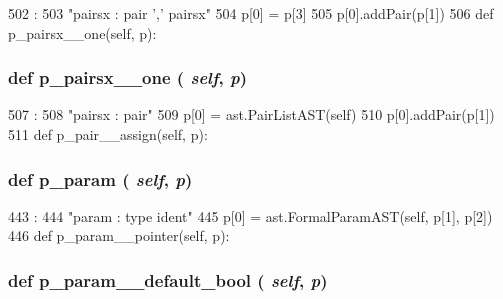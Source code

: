 \begin{DoxyVerb}
\begin{DoxyCode}
502                                :
503         "pairsx : pair ',' pairsx"
504         p[0] = p[3]
505         p[0].addPair(p[1])
506 
    def p_pairsx__one(self, p):
\end{DoxyCode}
\hypertarget{classslicc_1_1parser_1_1SLICC_aaf9410b6d0eedbb8812ebb8ac3609cdf}{
\subsubsection[{p\_\-pairsx\_\-\_\-one}]{\setlength{\rightskip}{0pt plus 5cm}def p\_\-pairsx\_\-\_\-one ( {\em self}, \/   {\em p})}}
\label{classslicc_1_1parser_1_1SLICC_aaf9410b6d0eedbb8812ebb8ac3609cdf}



\begin{DoxyCode}
507                               :
508         "pairsx : pair"
509         p[0] = ast.PairListAST(self)
510         p[0].addPair(p[1])
511 
    def p_pair__assign(self, p):
\end{DoxyCode}
\hypertarget{classslicc_1_1parser_1_1SLICC_a44acb9129e75c48ab21ea601ece829d9}{
\subsubsection[{p\_\-param}]{\setlength{\rightskip}{0pt plus 5cm}def p\_\-param ( {\em self}, \/   {\em p})}}
\label{classslicc_1_1parser_1_1SLICC_a44acb9129e75c48ab21ea601ece829d9}



\begin{DoxyCode}
443                         :
444         "param : type ident"
445         p[0] = ast.FormalParamAST(self, p[1], p[2])
446 
    def p_param__pointer(self, p):
\end{DoxyCode}
\hypertarget{classslicc_1_1parser_1_1SLICC_ab1301e8e7dbdfb7e2b5815e6173d02da}{
\subsubsection[{p\_\-param\_\-\_\-default\_\-bool}]{\setlength{\rightskip}{0pt plus 5cm}def p\_\-param\_\-\_\-default\_\-bool ( {\em self}, \/   {\em p})}}
\label{classslicc_1_1parser_1_1SLICC_ab1301e8e7dbdfb7e2b5815e6173d02da}




\end{DoxyVerb}
